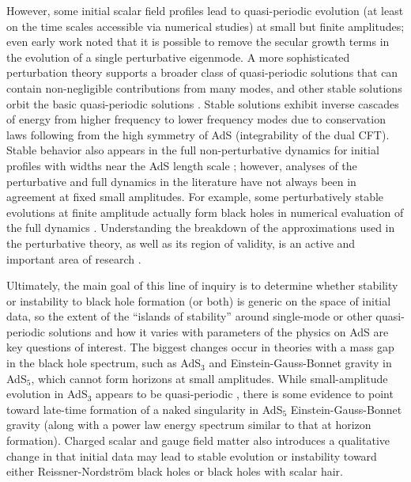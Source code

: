 \documentclass[../PhD.tex]{subfiles}
\begin{document}
However, some initial scalar field profiles lead to quasi-periodic evolution
(at least on the time scales accessible via numerical studies)
at small but finite amplitudes; even early work \cite{1104.3702,1109.1825}
noted that it is possible to remove the secular growth terms in the
evolution of a single perturbative eigenmode.  A more sophisticated
perturbation theory \cite{1403.6471,1407.6273,Basu:2014sia,1410.1880,1412.4761,1412.3249,Evnin:2015gma,1507.02684,1507.08261,1508.04943,1508.05474,1510.07836}
supports a broader class of quasi-periodic solutions that can contain
non-negligible contributions from many modes, and other stable solutions
orbit the basic quasi-periodic solutions \cite{1507.08261}.  Stable
solutions exhibit inverse cascades of energy from higher frequency to lower
frequency modes due to conservation laws following from the high symmetry
of AdS (integrability of the dual CFT).  Stable behavior also appears
in the full non-perturbative dynamics for initial profiles with widths near
the AdS length scale \cite{1304.4166,1307.2875,1308.1235}; however,
analyses of the perturbative and full dynamics in the literature have not
always been in agreement at fixed small amplitudes.  For example, some
perturbatively stable evolutions at finite amplitude actually form black holes
in numerical evaluation of the full dynamics
\cite{1403.6471,1410.2631,1506.07907}.  Understanding the breakdown of the
approximations used in the perturbative theory, as well as its region of
validity, is an active and important area of research
\cite{1506.03519,1606.02712,1607.08094,Dimitrakopoulos:2016euh,1706.07413}.

Ultimately, the main goal of this line of inquiry is to determine whether
stability or instability to black hole formation (or both) is generic on
the space of initial data, so the extent of the ``islands of stability''
around single-mode or other quasi-periodic solutions and how it varies
with parameters of the physics on AdS are key questions of interest.  The
biggest changes occur in theories with a mass gap in the black hole spectrum,
such as AdS$_3$ and Einstein-Gauss-Bonnet gravity in AdS$_5$, which cannot
form horizons at small amplitudes.  While small-amplitude evolution in
AdS$_3$ appears to be quasi-periodic \cite{1306.0317,1412.6002}, there is
some evidence to point toward late-time formation of a naked singularity
in AdS$_5$ Einstein-Gauss-Bonnet gravity \cite{1608.05402,1410.1869}
(along with a power law energy spectrum similar to that at horizon
formation).  Charged scalar and gauge field matter \cite{1606.00830}
also introduces a qualitative change in that initial data may lead to
stable evolution or instability toward either Reissner-Nordstr\"om black holes
or black holes with scalar hair.
\end{document}
